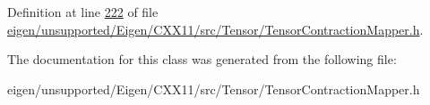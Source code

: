 Definition at line \hyperlink{eigen_2unsupported_2_eigen_2_c_x_x11_2src_2_tensor_2_tensor_contraction_mapper_8h_source_l00222}{222} of file \hyperlink{eigen_2unsupported_2_eigen_2_c_x_x11_2src_2_tensor_2_tensor_contraction_mapper_8h_source}{eigen/unsupported/\+Eigen/\+C\+X\+X11/src/\+Tensor/\+Tensor\+Contraction\+Mapper.\+h}.



The documentation for this class was generated from the following file\+:\begin{DoxyCompactItemize}
\item 
eigen/unsupported/\+Eigen/\+C\+X\+X11/src/\+Tensor/\+Tensor\+Contraction\+Mapper.\+h\end{DoxyCompactItemize}
